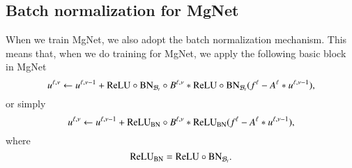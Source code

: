 \subsection{Batch normalization for MgNet}
When we train MgNet, we also adopt the batch normalization mechanism. 
This means that, when we do training for MgNet, we
apply the following basic block in MgNet
\begin{equation}\label{key}
u^{\ell,\nu} \leftarrow u^{\ell,\nu-1} + {\rm ReLU} \circ {\rm BN}_{\mathcal B_t} \circ B^{\ell,\nu}\ast {\rm ReLU} \circ {\rm BN}_{\mathcal B_t} ({f^\ell -  A^{\ell} \ast u^{\ell,\nu-1}}),
\end{equation}
or simply
\begin{equation}\label{key}
u^{\ell,\nu} \leftarrow u^{\ell,\nu-1} + {\rm ReLU}_{\rm BN} \circ B^{\ell,\nu}\ast {\rm ReLU}_{\rm BN} ({f^\ell -  A^{\ell} \ast u^{\ell,\nu-1}}),
\end{equation}
where
\begin{equation}\label{key}
{\rm ReLU}_{\rm BN} =  {\rm ReLU} \circ {\rm BN}_{\mathcal B_t}.
\end{equation}


